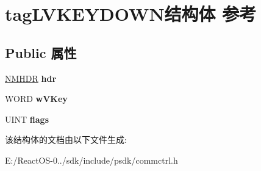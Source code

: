 \hypertarget{structtag_l_v_k_e_y_d_o_w_n}{}\section{tag\+L\+V\+K\+E\+Y\+D\+O\+W\+N结构体 参考}
\label{structtag_l_v_k_e_y_d_o_w_n}
\subsection*{Public 属性}
\begin{DoxyCompactItemize}
\item 
\mbox{\label{structtag_l_v_k_e_y_d_o_w_n_a51cfd3cbbf8880cae0f4fddb78f97958}} 
\hyperlink{structtag_n_m_h_d_r}{N\+M\+H\+DR} {\bfseries hdr}
\item 
\mbox{\label{structtag_l_v_k_e_y_d_o_w_n_afc2622481540135c5462c5a5c55a33d5}} 
W\+O\+RD {\bfseries w\+V\+Key}
\item 
\mbox{\label{structtag_l_v_k_e_y_d_o_w_n_a44ca45df9caf5777da39e021fe7fcf77}} 
U\+I\+NT {\bfseries flags}
\end{DoxyCompactItemize}


该结构体的文档由以下文件生成\+:\begin{DoxyCompactItemize}
\item 
E\+:/\+React\+O\+S-\/0../sdk/include/psdk/commctrl.\+h\end{DoxyCompactItemize}

